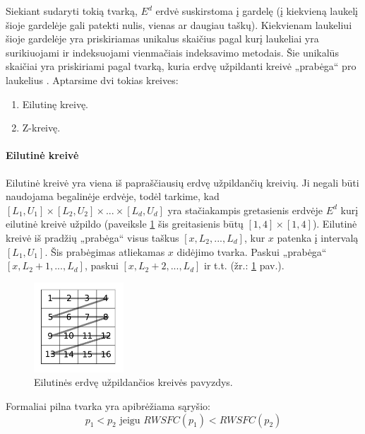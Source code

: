 Siekiant sudaryti tokią tvarką, $E^d$ erdvė suskirstoma į gardelę (į kiekvieną laukelį šioje gardelėje gali patekti nulis, vienas ar daugiau taškų).
Kiekvienam laukeliui šioje gardelėje yra priskiriamas unikalus skaičius pagal kurį laukeliai yra surikiuojami ir indeksuojami vienmačiais indeksavimo metodais.
Šie unikalūs skaičiai yra priskiriami pagal tvarką, kuria erdvę užpildanti kreivė „prabėga“ pro laukelius \cite{bader2012space}.
Aptarsime dvi tokias kreives:
\begin{enumerate}
	\item Eilutinę kreivę.
	\item Z-kreivę.
\end{enumerate}

\paragraph{Eilutinė kreivė}

Eilutinė kreivė yra viena iš papraščiausių erdvę užpildančių kreivių.
Ji negali būti naudojama begalinėje erdvėje, todėl tarkime, kad $[L_1, U_1] \times [L_2, U_2] \times ... \times [L_d, U_d]$ yra stačiakampis gretasienis erdvėje $E^d$ kurį eilutinė kreivė užpildo (paveiksle \ref{img:RowWiseSpaceFillingCurve} šis greitasienis būtų $[1, 4] \times [1, 4]$).
Eilutinė kreivė iš pradžių „prabėga“ visus taškus $[x, L_2, ..., L_d]$, kur $x$ patenka į intervalą $[L_1, U_1]$.
Šis prabėgimas atliekamas $x$ didėjimo tvarka.
Paskui „prabėga“ $[x, L_2 + 1, ..., L_d]$, paskui $[x, L_2 + 2, ..., L_d]$ ir t.t. (žr.: \ref{img:RowWiseSpaceFillingCurve} pav.).

\begin{figure}[H]
\begin{center}
\includegraphics[width=0.3\textwidth]{img/RowWiseSpaceFillingCurve.png}
\caption{Eilutinės erdvę užpildančios kreivės pavyzdys.}
\label{img:RowWiseSpaceFillingCurve}
\end{center}
\end{figure}


Formaliai pilna tvarka yra apibrėžiama sąryšio:
\begin{equation}
	p_1 < p_2 \text{ jeigu } RWSFC(p_1) < RWSFC(p_2)
\label{eq:RowWiseSFCComparison}
\end{equation}

